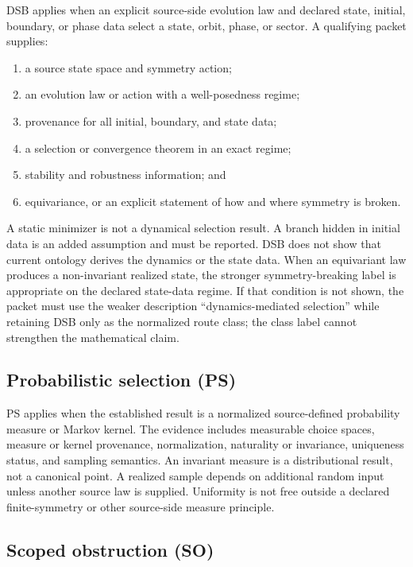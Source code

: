 \documentclass[11pt]{article}
\begin{document}
DSB applies when an explicit source-side evolution law and declared state,
initial, boundary, or phase data select a state, orbit, phase, or sector.  A
qualifying packet supplies:
\begin{enumerate}[label=DSB\arabic*.]
  \item a source state space and symmetry action;
  \item an evolution law or action with a well-posedness regime;
  \item provenance for all initial, boundary, and state data;
  \item a selection or convergence theorem in an exact regime;
  \item stability and robustness information; and
  \item equivariance, or an explicit statement of how and where symmetry is
        broken.
\end{enumerate}
A static minimizer is not a dynamical selection result.  A branch hidden in
initial data is an added assumption and must be reported.  DSB does not show
that current ontology derives the dynamics or the state data.
When an equivariant law produces a non-invariant realized state, the stronger
symmetry-breaking label is appropriate on the declared state-data regime.  If
that condition is not shown, the packet must use the weaker description
``dynamics-mediated selection'' while retaining DSB only as the normalized
route class; the class label cannot strengthen the mathematical claim.

\subsection{Probabilistic selection (PS)}

PS applies when the established result is a normalized source-defined
probability measure or Markov kernel.  The evidence includes measurable
choice spaces, measure or kernel provenance, normalization, naturality or
invariance, uniqueness status, and sampling semantics.  An invariant measure
is a distributional result, not a canonical point.  A realized sample depends
on additional random input unless another source law is supplied.  Uniformity
is not free outside a declared finite-symmetry or other source-side measure
principle.

\subsection{Scoped obstruction (SO)}
\end{document}
